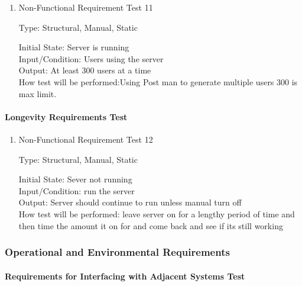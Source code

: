 \documentclass[12pt, titlepage]{article}
\begin{document}
\begin{enumerate}

\item{Non-Functional Requirement Test 11\\}

Type: Structural, Manual, Static 
					
Initial State: Server is running \\
					
Input/Condition: Users using the server \\
					
Output: At least 300 users at a time \\
					
How test will be performed:Using Post man to generate multiple users 300 is max limit. \\

\end{enumerate}


\paragraph{Longevity Requirements Test}

\begin{enumerate}


\item{Non-Functional Requirement Test 12\\}

Type: Structural, Manual, Static
					
Initial State: Sever not running \\
					
Input/Condition: run the server \\
					
Output: Server should continue to run unless manual turn off \\
					
How test will be performed: leave server on for a lengthy period of time and then time the amount it
on for and come back and see if its still working \\

\end{enumerate}

\subsubsection{Operational and Environmental Requirements}

\paragraph{Requirements for Interfacing with Adjacent Systems Test}
\end{document}
